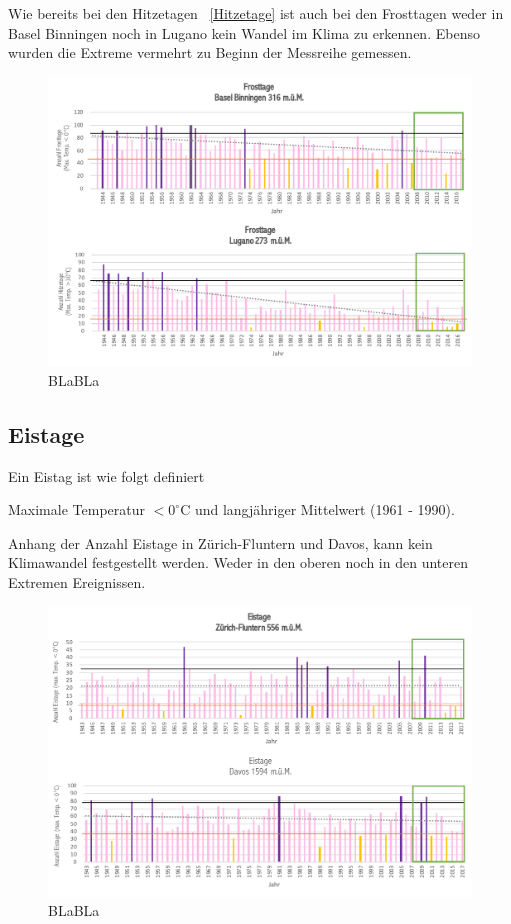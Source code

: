 \begin{refsection}
Wie bereits bei den Hitzetagen ~\ref{Hitzetage}  ist auch bei den Frosttagen weder in Basel Binningen noch in Lugano kein Wandel im Klima zu erkennen. Ebenso wurden die Extreme vermehrt zu Beginn der Messreihe gemessen.

\begin{figure}[htbp]
\centering
\includegraphics[width=1.0\textwidth]{extrem/Frosttage.pdf}
\caption{BLaBLa}
\label{Frosttage}
\end{figure}



\subsection{Eistage}
Ein Eistag ist wie folgt definiert

\begin{definition}
Maximale Temperatur $< 0^{\circ}$C und langjähriger Mittelwert (1961 - 1990).
\end{definition}


Anhang der Anzahl Eistage in Zürich-Fluntern und Davos, kann kein Klimawandel festgestellt werden. Weder in den oberen noch in den unteren Extremen Ereignissen.


\begin{figure}[htbp]
\centering
\includegraphics[width=1.0\textwidth]{extrem/Eistage.pdf}
\caption{BLaBLa}
\label{Eistage}
\end{figure}



\end{refsection}
